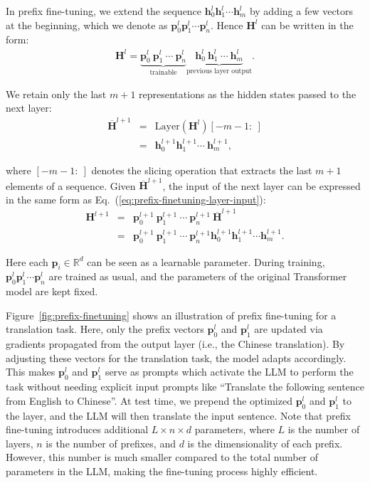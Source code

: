 In prefix fine-tuning, we extend the sequence $\mathbf{h}_0^l \mathbf{h}_1^l \cdots \mathbf{h}_m^l$ by adding a few vectors at the beginning, which we denote as $\mathbf{p}_0^l \mathbf{p}_1^l \cdots \mathbf{p}_n^l$. Hence $\mathbf{H}^l$ can be written in the form:
\begin{eqnarray}
\mathbf{H}^l = \underbrace{\mathbf{p}_0^l\ \mathbf{p}_1^l\ \cdots\ \mathbf{p}_n^l}_{\text{trainable}} \underbrace{\mathbf{h}_0^l\ \mathbf{h}_1^l\ \cdots\ \mathbf{h}_m^l}_{\text{previous layer output}}. \label{eq:prefix-finetuning-layer-input}
\end{eqnarray}

\noindent We retain only the last $m+1$ representations as the hidden states passed to the next layer:
\begin{eqnarray}
\overline{\mathbf{H}}^{l+1} & = & \mathrm{Layer}(\mathbf{H}^{l})[-m-1:\ ] \nonumber \\
                       & = & \mathbf{h}_0^{l+1}\mathbf{h}_1^{l+1}\cdots\ \mathbf{h}_m^{l+1},
\end{eqnarray}

\noindent where $[-m-1:\ ]$ denotes the slicing operation that extracts the last $m+1$ elements of a sequence. Given $\overline{\mathbf{H}}^{l+1}$, the input of the next layer can be expressed in the same form as Eq.~(\ref{eq:prefix-finetuning-layer-input}):
\begin{eqnarray}
\mathbf{H}^{l+1} & = & \mathbf{p}_0^{l+1}\ \mathbf{p}_1^{l+1}\ \cdots\ \mathbf{p}_n^{l+1}\ \overline{\mathbf{H}}^{l+1} \nonumber \\
                 & = & \mathbf{p}_0^{l+1}\ \mathbf{p}_1^{l+1}\ \cdots\ \mathbf{p}_n^{l+1} \mathbf{h}_0^{l+1}\mathbf{h}_1^{l+1}\cdots \mathbf{h}_m^{l+1}.
\end{eqnarray}

\noindent Here each $\mathbf{p}_i \in \mathbb{R}^d$ can be seen as a learnable parameter. During training, $\mathbf{p}_0^l \mathbf{p}_1^l \cdots\mathbf{p}_n^l$ are trained as usual, and the parameters of the original Transformer model are kept fixed.

Figure~\ref{fig:prefix-finetuning} shows an illustration of prefix fine-tuning for a translation task. Here, only the prefix vectors $\mathbf{p}_0^l$ and $\mathbf{p}_1^l$ are updated via gradients propagated from the output layer (i.e., the Chinese translation). By adjusting these vectors for the translation task, the model adapts accordingly. This makes $\mathbf{p}_0^l$ and $\mathbf{p}_1^l$ serve as prompts which activate the LLM to perform the task without needing explicit input prompts like ``Translate the following sentence from English to Chinese''. At test time, we prepend the optimized $\mathbf{p}_0^l$ and $\mathbf{p}_1^l$ to the layer, and the LLM will then translate the input sentence. Note that prefix fine-tuning introduces additional $L \times n \times d$ parameters, where $L$ is the number of layers, $n$ is the number of prefixes, and $d$ is the dimensionality of each prefix. However, this number is much smaller compared to the total number of parameters in the LLM, making the fine-tuning process highly efficient.

